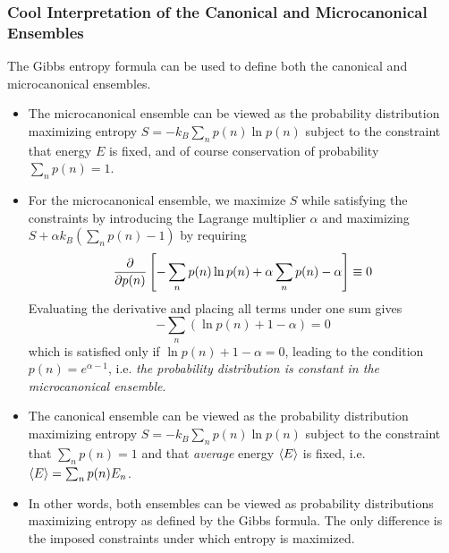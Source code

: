 \documentclass[11pt, a4paper]{article}
\begin{document}
\subsubsection{Cool Interpretation of the Canonical and Microcanonical Ensembles}
The Gibbs entropy formula can be used to define both the canonical and microcanonical ensembles.
\begin{itemize}
	\item The microcanonical ensemble can be viewed as the probability distribution maximizing entropy $ S = - k_{B} \sum_{n} p(n) \ln p(n) $ subject to the constraint that energy $ E $ is fixed, and of course conservation of probability $ \sum_{n}p(n) = 1 $.
	
	\item For the microcanonical ensemble, we maximize $ S $ while satisfying the constraints by introducing the Lagrange multiplier $ \alpha $ and maximizing $ S + \alpha k_{B}(\sum_{n}p(n) -1) $ by requiring
	\begin{equation*}
		\pdv{}{p(n)} \left[-\sum_{n} p(n) \ln p(n) + \alpha \sum_{n}p(n) - \alpha \right] \equiv 0
	\end{equation*}
	Evaluating the derivative and placing all terms under one sum gives
	\begin{equation*}
		- \sum_{n} \left(\ln p(n) + 1 - \alpha\right) = 0
	\end{equation*}
	which is satisfied only if $ \ln p(n) + 1 - \alpha = 0 $, leading to the condition $ p(n) = e^{\alpha - 1} $, i.e. \textit{the probability distribution is constant in the microcanonical ensemble}.
	
	\item The canonical ensemble can be viewed as the probability distribution maximizing entropy $ S = - k_{B} \sum_{n} p(n) \ln p(n) $ subject to the constraint that $ \sum_{n}p(n) = 1 $ and that \textit{average} energy $ \expval{E} $ is fixed, i.e. $ \expval{E} = \sum_{n}p(n)E_{n} $. 
	
	\item In other words, both ensembles can be viewed as probability distributions maximizing entropy as defined by the Gibbs formula. The only difference is the imposed constraints under which entropy is maximized.
	
\end{itemize}
\end{document}
